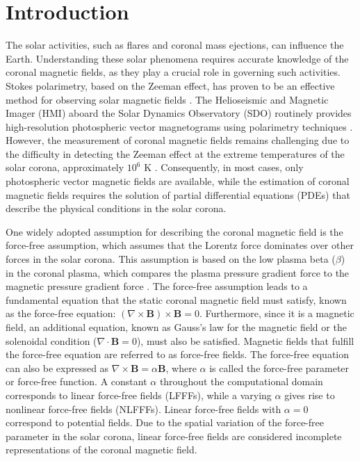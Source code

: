 
\section{Introduction}
The solar activities, such as flares and coronal mass ejections, can influence the Earth. Understanding these solar phenomena requires accurate knowledge of the coronal magnetic fields, as they play a crucial role in governing such activities. Stokes polarimetry, based on the Zeeman effect, has proven to be an effective method for observing solar magnetic fields \parencite{stenflo2013solar}. The Helioseismic and Magnetic Imager (HMI) aboard the Solar Dynamics Observatory (SDO) routinely provides high-resolution photospheric vector magnetograms using polarimetry techniques \parencite{schou2012polarization}. However, the measurement of coronal magnetic fields remains challenging due to the difficulty in detecting the Zeeman effect at the extreme temperatures of the solar corona, approximately $10^6$ K \parencite{cargill2009coronal}. Consequently, in most cases, only photospheric vector magnetic fields are available, while the estimation of coronal magnetic fields requires the solution of partial differential equations (PDEs) that describe the physical conditions in the solar corona.

One widely adopted assumption for describing the coronal magnetic field is the force-free assumption, which assumes that the Lorentz force dominates over other forces in the solar corona. This assumption is based on the low plasma beta ($\beta$) in the coronal plasma, which compares the plasma pressure gradient force to the magnetic pressure gradient force \parencite{gary2001plasma}. The force-free assumption leads to a fundamental equation that the static coronal magnetic field must satisfy, known as the force-free equation: $(\nabla \times \mathbf{B})\times\mathbf{B} = 0$. Furthermore, since it is a magnetic field, an additional equation, known as Gauss's law for the magnetic field or the solenoidal condition ($\nabla \cdot \mathbf{B} = 0$), must also be satisfied. Magnetic fields that fulfill the force-free equation are referred to as force-free fields. The force-free equation can also be expressed as $\nabla \times \mathbf{B} = \alpha \mathbf{B}$, where $\alpha$ is called the force-free parameter or force-free function. A constant $\alpha$ throughout the computational domain corresponds to linear force-free fields (LFFFs), while a varying $\alpha$ gives rise to nonlinear force-free fields (NLFFFs). Linear force-free fields with $\alpha = 0$ correspond to potential fields. Due to the spatial variation of the force-free parameter in the solar corona, linear force-free fields are considered incomplete representations of the coronal magnetic field.

